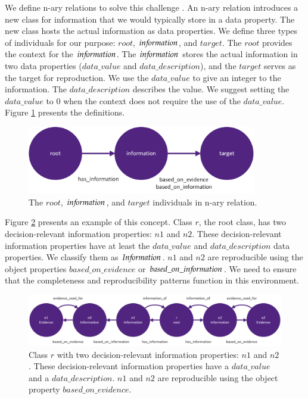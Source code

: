 We define n-ary relations to solve this challenge \parencite{WEB16}. An n-ary relation introduces a new class for information that we would typically store in a data property. The new class hosts the actual information as data properties. We define three types of individuals for our purpose: $root$, $in{\mkern-2mu f\mkern-3mu}ormation$, and $target$. The $root$ provides the context for the $in{\mkern-2mu f\mkern-3mu}ormation$. The $in{\mkern-2mu f\mkern-3mu}ormation$ stores the actual information in two data properties ($data\_value$ and $data\_description$), and the $target$ serves as the target for reproduction. We use the $data\_value$ to give an integer to the information. The $data\_description$ describes the value. We suggest setting the $data\_value$ to $0$ when the context does not require the use of the $data\_value$. Figure \ref{fig:root_information_target} presents the definitions.

\begin{figure}[H]
\centering
  \includegraphics[width=10cm]{../../Images/04_Contribution/04_root_information_target.png}
  \caption{The $root$, $in{\mkern-2mu f\mkern-3mu}ormation$, and $target$ individuals in n-ary relation.}
  \label{fig:root_information_target}
\end{figure}

Figure \ref{fig:DecisionDesignPattern_NARY3} presents an example of this concept. Class $r$, the root class, has two decision-relevant information properties: $n1$ and $n2$. These decision-relevant information properties have at least the $data\_value$ and $data\_description$ data properties. We classify them as $In{\mkern-2mu f\mkern-3mu}ormation$. $n1$ and $n2$ are reproducible using the object properties $based\_on\_evidence$ or $based\_on\_in{\mkern-2mu f\mkern-3mu}ormation$. We need to ensure that the completeness and reproducibility patterns function in this environment.

\begin{figure}[H]
\centering
  \includegraphics[width=17cm]{../../Images/04_Contribution/04_DecisionDesignPattern_NARY3.png}
  \caption{Class $r$ with two decision-relevant information properties: $n1$ and $n2$. These decision-relevant information properties have a $data\_value$ and a $data\_description$. $n1$ and $n2$ are reproducible using the object property $based\_on\_evidence$.}
  \label{fig:DecisionDesignPattern_NARY3}
\end{figure}

